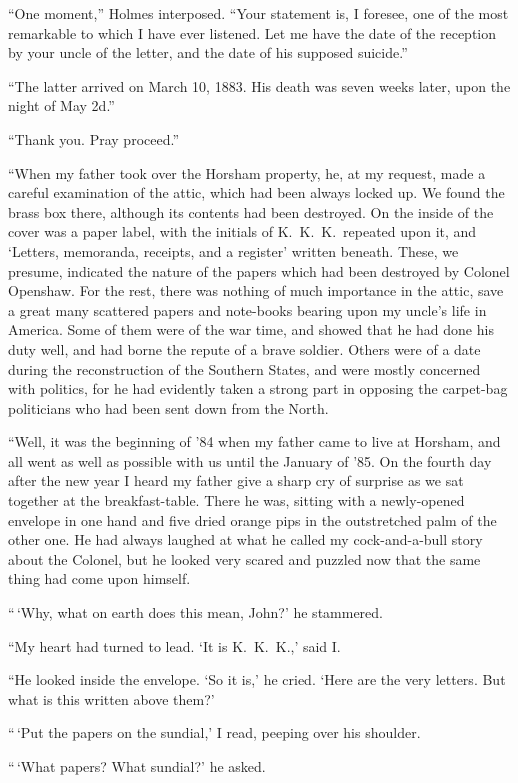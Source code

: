 “One moment,” Holmes interposed. “Your statement is,
I foresee, one of the most remarkable to which I have ever
listened. Let me have the date of the reception by your uncle
of the letter, and the date of his supposed suicide.”

“The latter arrived on March 10, 1883. His death was
seven weeks later, upon the night of May 2d.”

“Thank you. Pray proceed.”

“When my father took over the Horsham property, he, at
my request, made a careful examination of the attic, which
had been always locked up. We found the brass box there,
although its contents had been destroyed. On the inside of
the cover was a paper label, with the initials of K.\ K.\ K.\ repeated
upon it, and ‘Letters, memoranda, receipts, and a register’
written beneath. These, we presume, indicated the
nature of the papers which had been destroyed by Colonel
Openshaw. For the rest, there was nothing of much importance
in the attic, save a great many scattered papers and
note-books bearing upon my uncle’s life in America. Some of
them were of the war time, and showed that he had done his
duty well, and had borne the repute of a brave soldier. Others
were of a date during the reconstruction of the Southern
States, and were mostly concerned with politics, for he had
evidently taken a strong part in opposing the carpet-bag politicians
who had been sent down from the North.

“Well, it was the beginning of ’84 when my father came to
live at Horsham, and all went as well as possible with us until
the January of ’85. On the fourth day after the new year I
heard my father give a sharp cry of surprise as we sat together
at the breakfast-table. There he was, sitting with a
newly-opened envelope in one hand and five dried orange pips
in the outstretched palm of the other one. He had always
laughed at what he called my cock-and-a-bull story about the
Colonel, but he looked very scared and puzzled now that the
same thing had come upon himself.

“\,‘Why, what on earth does this mean, John?’ he
stammered.

“My heart had turned to lead. ‘It is K.\ K.\ K.,’ said I.

“He looked inside the envelope. ‘So it is,’ he cried.
‘Here are the very letters. But what is this written above
them?’

“\,‘Put the papers on the sundial,’ I read, peeping over his
shoulder.

“\,‘What papers? What sundial?’ he asked.

